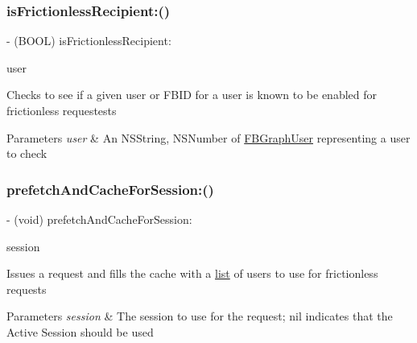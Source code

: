 \subsubsection{\texorpdfstring{is\+Frictionless\+Recipient\+:()}{isFrictionlessRecipient:()}\hspace{0.1cm}{\footnotesize\ttfamily [5/5]}}
{\footnotesize\ttfamily -\/ (B\+O\+OL) is\+Frictionless\+Recipient\+: \begin{DoxyParamCaption}\item[{(id)}]{user }\end{DoxyParamCaption}}

Checks to see if a given user or F\+B\+ID for a user is known to be enabled for frictionless requestests


\begin{DoxyParams}{Parameters}
{\em user} & An N\+S\+String, N\+S\+Number of {\ttfamily \hyperlink{protocolFBGraphUser-p}{F\+B\+Graph\+User}} representing a user to check \\
\hline
\end{DoxyParams}
\mbox{\label{interfaceFBFrictionlessRecipientCache_a4f218828f2b6a8bb5a8e0044e98689dc}} 
\subsubsection{\texorpdfstring{prefetch\+And\+Cache\+For\+Session\+:()}{prefetchAndCacheForSession:()}\hspace{0.1cm}{\footnotesize\ttfamily [1/5]}}
{\footnotesize\ttfamily -\/ (void) prefetch\+And\+Cache\+For\+Session\+: \begin{DoxyParamCaption}\item[{(\hyperlink{interfaceFBSession}{F\+B\+Session} $\ast$)}]{session }\end{DoxyParamCaption}}

Issues a request and fills the cache with a \hyperlink{protocollist-p}{list} of users to use for frictionless requests


\begin{DoxyParams}{Parameters}
{\em session} & The session to use for the request; nil indicates that the Active Session should be used \\
\hline
\end{DoxyParams}


